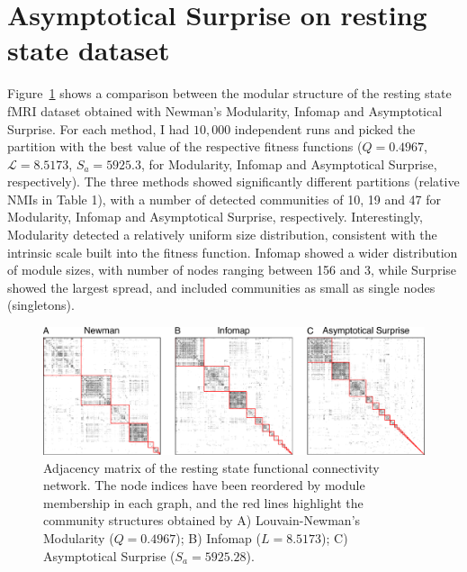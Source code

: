 \section{Asymptotical Surprise on resting state dataset}
Figure~\ref{fig:partitioncomparison} shows a comparison between the modular structure of the resting state fMRI dataset obtained with Newman's Modularity, Infomap and Asymptotical Surprise.
For each method, I had $10,000$ independent runs and picked the partition with the best value of the respective fitness functions ($Q=0.4967$, $\mathcal{L}=8.5173$, $S_a=5925.3$, for Modularity, Infomap and Asymptotical Surprise, respectively).
The three methods showed significantly different partitions (relative NMIs in Table 1), with a number of detected communities of 10, 19 and 47 for Modularity, Infomap and Asymptotical Surprise, respectively.
Interestingly, Modularity detected a relatively uniform size distribution, consistent with the intrinsic scale built into the fitness function.
Infomap showed a wider distribution of module sizes, with number of nodes ranging between 156 and 3, while Surprise showed the largest spread, and included communities as small as single nodes (singletons).
\begin{figure}[!htb]
\centering
\includegraphics[width=\textwidth]{images/pacopaperfigure6.pdf}
\caption{Adjacency matrix of the resting state functional connectivity network. The node indices have been reordered by module membership in each graph, and the red lines highlight the community structures obtained by A) Louvain-Newman's Modularity ($Q=0.4967$); B) Infomap ($L=8.5173$); C) Asymptotical Surprise ($S_a=5925.28$).}
\label{fig:partitioncomparison}
\end{figure}

